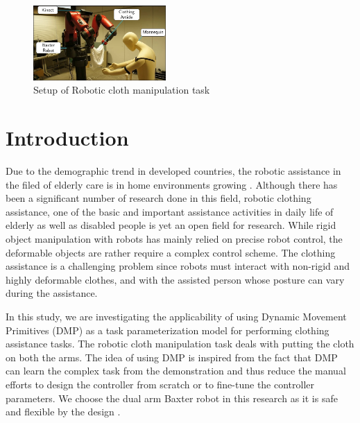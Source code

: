 \documentclass[sigconf]{acmart}
\begin{document}




\maketitle

\begin{figure}
	\includegraphics[width=0.45\textwidth]{setup}
	\caption{Setup of Robotic cloth manipulation task}
	\label{setup}
\end{figure}

\section{Introduction}
\label{introduction}
Due to the demographic trend in developed countries, the robotic assistance in the filed of elderly care is in home environments growing \cite{broekens2009assistive}. Although there has been a significant number of research done in this field, robotic clothing assistance, one of the basic and important assistance activities in daily life of elderly as well as disabled people is yet an open field for research. While rigid object manipulation with robots has mainly relied on precise robot control, the deformable objects are rather require a complex control scheme. The clothing assistance is a challenging problem since robots must interact with non-rigid and highly deformable clothes, and with the assisted person whose posture can vary during the assistance. 

In this study, we are investigating the applicability of using Dynamic Movement Primitives (DMP) as a task parameterization model for performing clothing assistance tasks. The robotic cloth manipulation task deals with putting the cloth on both the arms. The idea of using DMP is inspired from the fact that DMP can learn the complex task from the demonstration \cite{ijspeert2003learning, schaal2006dynamic, ijspeert2013dynamical} and thus reduce the manual efforts to design the controller from scratch or to fine-tune the controller parameters. We choose the dual arm Baxter robot in this research as it is safe and flexible by the design \cite{fitzgerald2013developing}.
\end{document}
